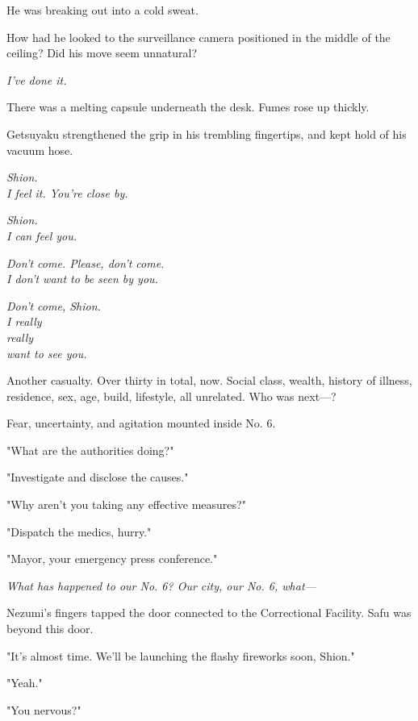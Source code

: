 He was breaking out into a cold sweat.

How had he looked to the surveillance camera positioned in the middle of
the ceiling? Did his move seem unnatural?

\emph{I've done it.}

There was a melting capsule underneath the desk. Fumes rose up thickly.

Getsuyaku strengthened the grip in his trembling fingertips, and kept
hold of his vacuum hose.

\mybreak

\emph{Shion.\\
	I feel it. You're close by.}

\myspace

\emph{Shion.\\
	I can feel you.}

\myspace

\emph{Don't come. Please, don't come.\\
	I don't want to be seen by you.}

\myspace

\emph{Don't come, Shion.\\
	I really\\
	really\\
	want to see you.}

\mybreak

Another casualty. Over thirty in total, now. Social class, wealth,
history of illness, residence, sex, age, build, lifestyle, all
unrelated. Who was next---?

Fear, uncertainty, and agitation mounted inside No. 6.

"What are the authorities doing?"

"Investigate and disclose the causes."

"Why aren't you taking any effective measures?"

"Dispatch the medics, hurry."

"Mayor, your emergency press conference."

\emph{What has happened to our No. 6? Our city, our No. 6, what---}

\mybreak

Nezumi's fingers tapped the door connected to the Correctional Facility.
Safu was beyond this door.

"It's almost time. We'll be launching the flashy fireworks soon, Shion."

"Yeah."

"You nervous?"

